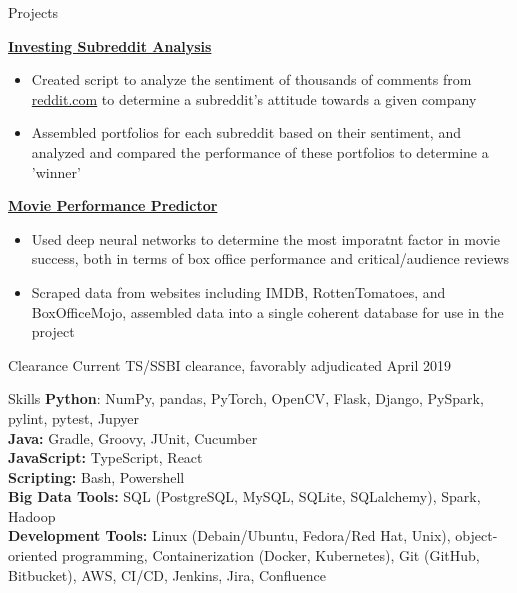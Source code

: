 \documentclass[8pt]{resumeclass}
\begin{document}
\vspace{8pt}
\resumesect
    {Projects}
    {\href{https://github.com/erkearney/investing-subreddit-analysis}{\textbf{Investing
    Subreddit Analysis}}
    \begin{itemize}[noitemsep,nolistsep]
	\item Created script to analyze the sentiment of thousands of comments
	from \href{reddit.com}{reddit.com} to determine a subreddit's attitude towards a given
	company
	\item Assembled portfolios for each subreddit based on their sentiment,
	and analyzed and compared the performance of these portfolios to
	determine a 'winner'
    \end{itemize}

    \vspace{3pt}
    \href{https://github.com/GabrieleMaurina/MoviePerformancePredictor}{\textbf{Movie
    Performance Predictor}}
    {\begin{itemize}[noitemsep,nolistsep]
	\item Used deep neural networks to determine the most imporatnt factor
	in movie success, both in terms of box office performance and
	critical/audience reviews
	\item Scraped data from websites including IMDB, RottenTomatoes, and
	BoxOfficeMojo, assembled data into a single coherent database for use in
	the project
    \end{itemize}}}
\vspace{8pt}
\resumesect
    {Clearance}
    {Current TS/SSBI clearance, favorably adjudicated April 2019}
\vspace{8pt}

\resumesect
    {Skills}
    {
    \textbf{Python}: NumPy, pandas, PyTorch, OpenCV, Flask, Django, PySpark,
    pylint, pytest, Jupyer\\
    \textbf{Java:} Gradle, Groovy, JUnit, Cucumber\\
    \textbf{JavaScript:} TypeScript, React\\
    \textbf{Scripting:} Bash, Powershell\\
    \textbf{Big Data Tools:} SQL (PostgreSQL, MySQL, SQLite,
    SQLalchemy), Spark, Hadoop\\
    \textbf{Development Tools:} Linux (Debain/Ubuntu, Fedora/Red Hat, Unix),
    object-oriented programming, Containerization (Docker, Kubernetes), Git (GitHub, Bitbucket), AWS, CI/CD, Jenkins, Jira, Confluence}
\end{document}
